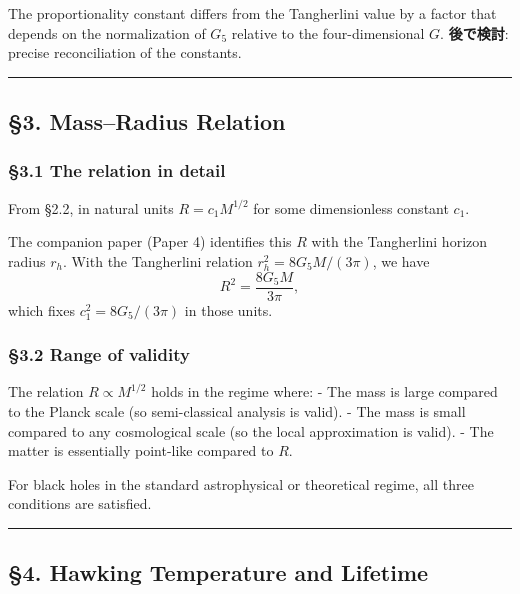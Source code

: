 \documentclass[a4paper,11pt]{article}
\theoremstyle{definition}
\begin{document}
The proportionality constant differs from the Tangherlini value by a
factor that depends on the normalization of \(G_5\) relative to the
four-dimensional \(G\). \textbf{後で検討}: precise reconciliation of the
constants.

\begin{center}\rule{0.5\linewidth}{0.5pt}\end{center}

\subsection{§3. Mass--Radius Relation}\label{massradius-relation}

\subsubsection{§3.1 The relation in
detail}\label{the-relation-in-detail}

From §2.2, in natural units \(R = c_1 M^{1/2}\) for some dimensionless
constant \(c_1\).

The companion paper (Paper 4) identifies this \(R\) with the Tangherlini
horizon radius \(r_h\). With the Tangherlini relation
\(r_h^2 = 8 G_5 M/(3\pi)\), we have \[R^2 = \frac{8 G_5 M}{3\pi},\]
which fixes \(c_1^2 = 8 G_5/(3\pi)\) in those units.

\subsubsection{§3.2 Range of validity}\label{range-of-validity}

The relation \(R \propto M^{1/2}\) holds in the regime where: - The mass
is large compared to the Planck scale (so semi-classical analysis is
valid). - The mass is small compared to any cosmological scale (so the
local approximation is valid). - The matter is essentially point-like
compared to \(R\).

For black holes in the standard astrophysical or theoretical regime, all
three conditions are satisfied.

\begin{center}\rule{0.5\linewidth}{0.5pt}\end{center}

\subsection{§4. Hawking Temperature and
Lifetime}\label{hawking-temperature-and-lifetime}
\end{document}
